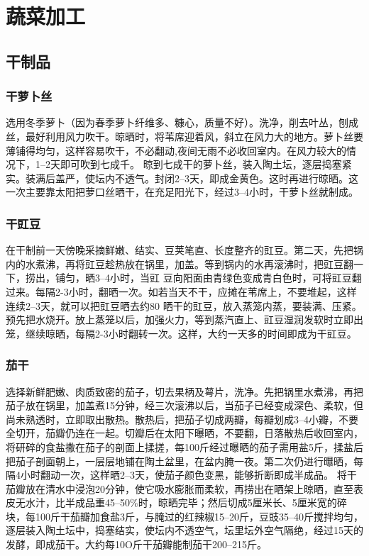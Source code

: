 \documentclass{ctexbook}
\begin{document}
\chapter{蔬菜加工}
\section{干制品}
\subsection{干萝卜丝}
选用冬季萝卜（因为春季萝卜纤维多、糠心，质量不好）。洗净，削去叶丛，刨成丝，最好利用风力吹干。晾晒时，将苇席迎着风，斜立在风力大的地方。萝卜丝要薄铺得均匀，这样容易吹干，不必翻动,夜间无雨不必收回室内。在风力较大的情况下，1--2天即可吹到七成千。
晾到七成干的萝卜丝，装入陶土坛，逐层捣塞紧实。装满后盖严，使坛内不透气。封闭2--3天，即成金黄色。这时再进行晾晒。这一次主要靠太阳把萝口丝晒干，在充足阳光下，经过3--4小时，干萝卜丝就制成。
\subsection{干豇豆}
在干制前一天傍晚采摘鲜嫩、结实、豆荚笔直、长度整齐的豇豆。第二天，先把锅内的水煮沸，再将豇豆趁热放在锅里，加盖。等到锅内的水再滚沸时，把豇豆翻一下，捞出，铺匀，晒3--4小时，当豇
豆向阳面由青绿色变成青白色时，可将豇豆翻过来。每隔2-3小时，翻晒一次。如若当天不干，应摊在苇席上，不要堆起，这样连续2--3天，就可以把豇豆晒去约80%
晒干的豇豆，放入蒸笼内蒸，要装满、压紧。预先把水烧开。放上蒸笼以后，加强火力，等到蒸汽直上、豇豆湿润发软时立即出笼，继续晾晒，每隔2-3小时翻转一次。这样，大约一天多的时间即成为干豇豆。

\subsection{茄干}
选择新鲜肥嫩、肉质致密的茄子，切去果柄及萼片，洗净。先把锅里水煮沸，再把茄子放在锅里，加盖煮15分钟，经三次滚沸以后，当茄子已经变成深色、柔软，但尚未熟透时，立即取出散热。散热后，把茄子切成两瓣，每瓣划成3--4小瓣，不要全切开，茄瓣仍连在一起。切瓣后在太阳下曝晒，不要翻，日落散热后收回室内，将研碎的食盐撒在茄子的剖面上揉搓，每100斤经过曝晒的茄子需用盐5斤，揉盐后把茄子剖面朝上，一层层地铺在陶土盆里，在盆内腌一夜。第二次仍进行曝晒，每隔4小时翻动一次，这样晒2--3天，使茄子颜色变黑，能够折断即成半成品。
将干茄瓣放在清水中浸泡20分钟，使它吸水膨胀而柔软，再捞出在晒架上晾晒，直至表皮无水汁，比半成品重45--50\%时，晾晒完毕；然后切成5厘米长、5厘米宽的碎块，每100斤干茄瓣加食盐3斤，与腌过的红辣椒15--20斤，豆豉35--40斤搅拌均匀，逐层装入陶土坛中，捣塞结实，使坛内不透空气，坛里坛外空气隔绝，经过15天的发酵，即成茄干。大约每10O斤干茄瓣能制茄干200--215斤。
\end{document}
